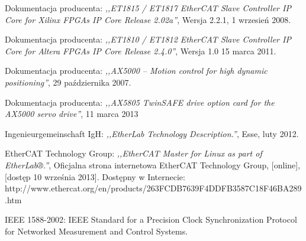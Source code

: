 \begin{thebibliography}{99}
Dokumentacja producenta: 
\emph{,,ET1815 / ET1817 EtherCAT Slave Controller IP Core for Xilinx FPGAs IP Core Release 2.02a''}, 
Wersja 2.2.1,
1 wrzesień 2008.

Dokumentacja producenta: 
\emph{,,ET1810 / ET1812 EtherCAT Slave Controller IP Core for Altera FPGAs IP Core Release 2.4.0''}, 
Wersja 1.0
15 marca 2011.

Dokumentacja producenta: 
\emph{,,AX5000 – Motion control for high dynamic positioning''},
29 października 2007.

Dokumentacja producenta: 
\emph{,,AX5805 TwinSAFE drive option card for the AX5000 servo drive''},
11 marca 2013

Ingenieurgemeinschaft IgH:
\emph{,,EtherLab Technology Description.''},
Esse,
luty 2012.

EtherCAT Technology Group:
\emph{,,EtherCAT Master for Linux as part of EtherLab®.''},
Oficjalna strona internetowa EtherCAT Technology Group,
[online],
[dostęp 10 września 2013].
Dostępny w Internecie: \\
http://www.ethercat.org/en/products/263FCDB7639F4DDFB3587C18F46BA289.htm

IEEE 1588-2002: IEEE Standard for a Precision Clock Synchronization Protocol for Networked Measurement and Control Systems.


\end{thebibliography}